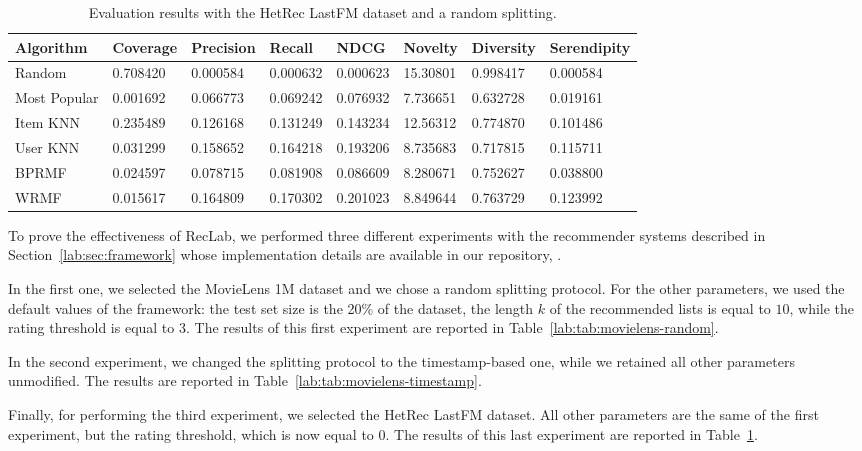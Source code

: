 \begin{table}
\centering
\begin{tabular}{@{}llllllll@{}}
\toprule
Algorithm    & Coverage & Precision & Recall   & NDCG     & Novelty  & Diversity & Serendipity \\ \midrule
Random       & 0.708420 & 0.000584  & 0.000632 & 0.000623 & 15.30801 & 0.998417  & 0.000584    \\
Most Popular & 0.001692 & 0.066773  & 0.069242 & 0.076932 & 7.736651 & 0.632728  & 0.019161    \\
Item KNN     & 0.235489 & 0.126168  & 0.131249 & 0.143234 & 12.56312 & 0.774870  & 0.101486    \\
User KNN     & 0.031299 & 0.158652  & 0.164218 & 0.193206 & 8.735683 & 0.717815  & 0.115711    \\
BPRMF        & 0.024597 & 0.078715  & 0.081908 & 0.086609 & 8.280671 & 0.752627  & 0.038800    \\
WRMF         & 0.015617 & 0.164809  & 0.170302 & 0.201023 & 8.849644 & 0.763729  & 0.123992    \\ \bottomrule
\end{tabular}
\caption[Evaluation with LastFM and random splitting]{Evaluation results with the HetRec LastFM dataset and a random splitting.}
\label{lab:tab:lastfm}
\end{table}

To prove the effectiveness of RecLab, we performed three different experiments with the recommender systems described in Section~\ref{lab:sec:framework} whose implementation details are available in our repository, .

In the first one, we selected the MovieLens 1M dataset and we chose a random splitting protocol. For the other parameters, we used the default values of the framework: the test set size is the 20\% of the dataset, the length $k$ of the recommended lists is equal to $10$, while the rating threshold is equal to $3$. The results of this first experiment are reported in Table~\ref{lab:tab:movielens-random}.

In the second experiment, we changed the splitting protocol to the timestamp-based one, while we retained all other parameters unmodified. The results are reported in Table~\ref{lab:tab:movielens-timestamp}.

Finally, for performing the third experiment, we selected the HetRec LastFM dataset. All other parameters are the same of the first experiment, but the rating threshold, which is now equal to $0$. The results of this last experiment are reported in Table~\ref{lab:tab:lastfm}.

